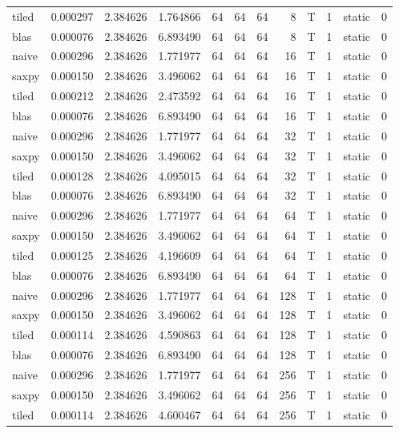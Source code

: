 \documentclass[
  12pt,
  xcolor = usenames,dvipsnames]{article}
\begin{document}
\begin{table}[!h]
{\begin{tabular}[t]{lrrrrrrrlrlr}
tiled & 0.000297 & 2.384626 & 1.764866 & 64 & 64 & 64 & 8 & T & 1 & static & 0\\
\addlinespace
blas & 0.000076 & 2.384626 & 6.893490 & 64 & 64 & 64 & 8 & T & 1 & static & 0\\
naive & 0.000296 & 2.384626 & 1.771977 & 64 & 64 & 64 & 16 & T & 1 & static & 0\\
saxpy & 0.000150 & 2.384626 & 3.496062 & 64 & 64 & 64 & 16 & T & 1 & static & 0\\
tiled & 0.000212 & 2.384626 & 2.473592 & 64 & 64 & 64 & 16 & T & 1 & static & 0\\
blas & 0.000076 & 2.384626 & 6.893490 & 64 & 64 & 64 & 16 & T & 1 & static & 0\\
\addlinespace
naive & 0.000296 & 2.384626 & 1.771977 & 64 & 64 & 64 & 32 & T & 1 & static & 0\\
saxpy & 0.000150 & 2.384626 & 3.496062 & 64 & 64 & 64 & 32 & T & 1 & static & 0\\
tiled & 0.000128 & 2.384626 & 4.095015 & 64 & 64 & 64 & 32 & T & 1 & static & 0\\
blas & 0.000076 & 2.384626 & 6.893490 & 64 & 64 & 64 & 32 & T & 1 & static & 0\\
naive & 0.000296 & 2.384626 & 1.771977 & 64 & 64 & 64 & 64 & T & 1 & static & 0\\
\addlinespace
saxpy & 0.000150 & 2.384626 & 3.496062 & 64 & 64 & 64 & 64 & T & 1 & static & 0\\
tiled & 0.000125 & 2.384626 & 4.196609 & 64 & 64 & 64 & 64 & T & 1 & static & 0\\
blas & 0.000076 & 2.384626 & 6.893490 & 64 & 64 & 64 & 64 & T & 1 & static & 0\\
naive & 0.000296 & 2.384626 & 1.771977 & 64 & 64 & 64 & 128 & T & 1 & static & 0\\
saxpy & 0.000150 & 2.384626 & 3.496062 & 64 & 64 & 64 & 128 & T & 1 & static & 0\\
\addlinespace
tiled & 0.000114 & 2.384626 & 4.590863 & 64 & 64 & 64 & 128 & T & 1 & static & 0\\
blas & 0.000076 & 2.384626 & 6.893490 & 64 & 64 & 64 & 128 & T & 1 & static & 0\\
naive & 0.000296 & 2.384626 & 1.771977 & 64 & 64 & 64 & 256 & T & 1 & static & 0\\
saxpy & 0.000150 & 2.384626 & 3.496062 & 64 & 64 & 64 & 256 & T & 1 & static & 0\\
tiled & 0.000114 & 2.384626 & 4.600467 & 64 & 64 & 64 & 256 & T & 1 & static & 0\\

\end{tabular}}
\end{table}
\end{document}
